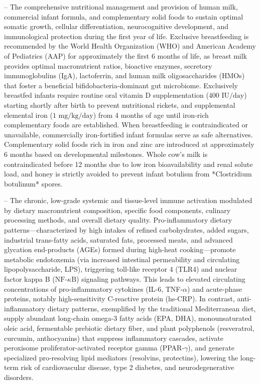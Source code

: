 -- The comprehensive nutritional management and provision of human milk, commercial infant formula, and complementary solid foods to sustain optimal somatic growth, cellular differentiation, neurocognitive development, and immunological protection during the first year of life. Exclusive breastfeeding is recommended by the World Health Organization (WHO) and American Academy of Pediatrics (AAP) for approximately the first 6 months of life, as breast milk provides optimal macronutrient ratios, bioactive enzymes, secretory immunoglobulins (IgA), lactoferrin, and human milk oligosaccharides (HMOs) that foster a beneficial bifidobacteria-dominant gut microbiome. Exclusively breastfed infants require routine oral vitamin D supplementation ($400\text{ IU/day}$) starting shortly after birth to prevent nutritional rickets, and supplemental elemental iron ($1\text{ mg/kg/day}$) from 4 months of age until iron-rich complementary foods are established. When breastfeeding is contraindicated or unavailable, commercially iron-fortified infant formulas serve as safe alternatives. Complementary solid foods rich in iron and zinc are introduced at approximately 6 months based on developmental milestones. Whole cow's milk is contraindicated before 12 months due to low iron bioavailability and renal solute load, and honey is strictly avoided to prevent infant botulism from *Clostridium botulinum* spores.

-- The chronic, low-grade systemic and tissue-level immune activation modulated by dietary macronutrient composition, specific food components, culinary processing methods, and overall dietary quality. Pro-inflammatory dietary patterns---characterized by high intakes of refined carbohydrates, added sugars, industrial trans-fatty acids, saturated fats, processed meats, and advanced glycation end-products (AGEs) formed during high-heat cooking---promote metabolic endotoxemia (via increased intestinal permeability and circulating lipopolysaccharide, LPS), triggering toll-like receptor 4 (TLR4) and nuclear factor kappa B ($\text{NF-}\kappa\text{B}$) signaling pathways. This leads to elevated circulating concentrations of pro-inflammatory cytokines (IL-6, TNF-$\alpha$) and acute-phase proteins, notably high-sensitivity C-reactive protein (hs-CRP). In contrast, anti-inflammatory dietary patterns, exemplified by the traditional Mediterranean diet, supply abundant long-chain omega-3 fatty acids (EPA, DHA), monounsaturated oleic acid, fermentable prebiotic dietary fiber, and plant polyphenols (resveratrol, curcumin, anthocyanins) that suppress inflammatory cascades, activate peroxisome proliferator-activated receptor gamma (PPAR-$\gamma$), and generate specialized pro-resolving lipid mediators (resolvins, protectins), lowering the long-term risk of cardiovascular disease, type 2 diabetes, and neurodegenerative disorders.


